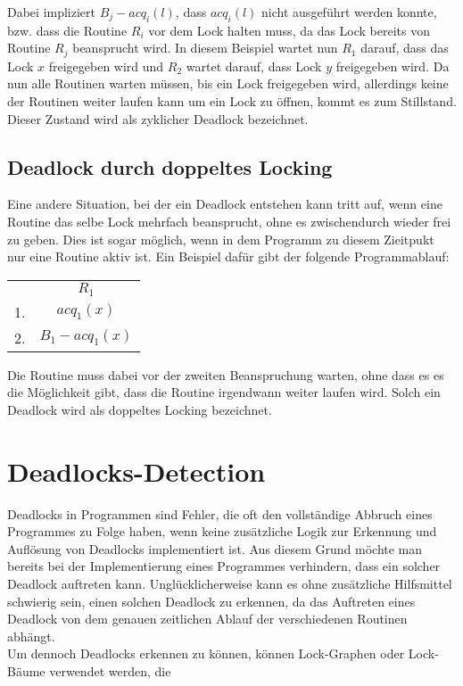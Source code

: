 Dabei impliziert $B_j-acq_i(l)$, dass $acq_{i}(l)$ nicht ausgeführt werden konnte,
bzw. dass die Routine $R_i$ vor dem Lock halten muss, da das Lock bereits von 
Routine $R_j$ beansprucht wird. In diesem Beispiel wartet nun $R_1$ 
darauf, dass das Lock $x$ freigegeben wird und $R_2$ wartet darauf, dass Lock 
$y$ freigegeben wird. Da nun alle Routinen warten müssen, bis ein Lock freigegeben 
wird, allerdings keine der Routinen weiter laufen kann um ein Lock zu öffnen, 
kommt es zum Stillstand. Dieser Zustand wird als zyklicher Deadlock bezeichnet.
\subsection{Deadlock durch doppeltes Locking}\label{Kap::Theo:DoubleLocking}
Eine andere Situation, bei der ein Deadlock entstehen kann tritt auf, wenn 
eine Routine das selbe Lock mehrfach beansprucht, ohne es zwischendurch wieder 
frei zu geben. Dies ist sogar möglich, wenn in dem Programm zu diesem Zieitpukt
nur eine Routine aktiv ist. Ein Beispiel dafür gibt der folgende Programmablauf:
\begin{table}[H]
    \centering
    \begin{tabular}{cc}
        & $R_1$ \\
        1. & $acq_{1}(x)$ \\
        2. & $B_1-acq_1(x)$
    \end{tabular}
\end{table}
Die Routine muss dabei vor der zweiten Beanspruchung warten,
ohne dass es es die Möglichkeit gibt, dass die Routine irgendwann weiter laufen wird.
Solch ein Deadlock wird als doppeltes Locking bezeichnet.\\
\section{Deadlocks-Detection}
Deadlocks in Programmen sind Fehler, die oft den vollständige Abbruch eines 
Programmes zu Folge haben, wenn keine zusätzliche Logik zur Erkennung und Auflösung von 
Deadlocks implementiert ist. Aus diesem Grund möchte man bereits bei der 
Implementierung eines Programmes verhindern, dass ein solcher Deadlock auftreten 
kann. Unglücklicherweise kann es ohne zusätzliche Hilfsmittel schwierig sein, 
einen solchen Deadlock zu erkennen, da das Auftreten eines Deadlock von dem 
genauen zeitlichen Ablauf der verschiedenen Routinen abhängt.\\
Um dennoch Deadlocks 
erkennen zu können, können Lock-Graphen oder Lock-Bäume verwendet werden, die 
